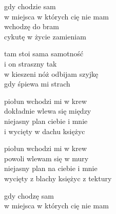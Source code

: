 \begin{text}
    gdy chodzie sam\\
    w miejsca w których cię nie mam\\
    wchodzę do bram\\
    cykutę w życie zamieniam

    tam stoi sama samotność\\
    i on straszny tak\\
    w kieszeni nóż odbijam szyjkę\\
    gdy śpiewa mi strach

    piołun wchodzi mi w krew\\
    dokładnie wlewa się między\\
    niejasny plan ciebie i mnie\\
    i wycięty w dachu księżyc

    piołun wchodzi mi w krew\\
    powoli wlewam się w mury\\
    niejasny plan na ciebie i mnie\\
    wycięty z blachy księżyc z tektury

    gdy chodzę sam\\
    w miejsca w których cię nie mam
\end{text}
\begin{chord}

\end{chord}